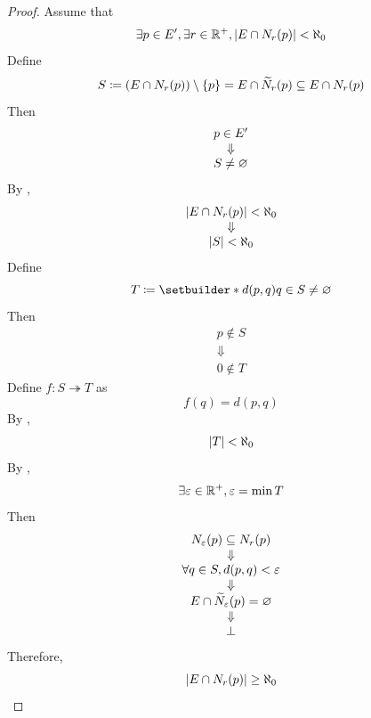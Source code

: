 \begin{proof}
    Assume that
    \[
    \exists p \in E', \exists r \in \R^{+}, \abs*{E \cap N_{r}(p)} < \aleph_{0}
    \]
    Define
    \[
    S \coloneqq (E \cap N_{r}(p)) \setminus \set*{p} = E \cap \widetilde{N}_{r}(p) \subseteq E \cap N_{r}(p)
    \]
    Then
    \[
    \begin{array}{c}
        p \in E' \\
        \Downarrow \\
        S \neq \vnot
    \end{array}
    \]
    By ,
    \[
    \begin{array}{c}
        \abs*{E \cap N_{r}(p)} < \aleph_{0} \\
        \Downarrow \\
        \abs*{S} < \aleph_{0}
    \end{array}
    \]
    Define
    \[
    T \coloneqq \setbuilder*{d(p, q)}{q \in S} \neq \vnot
    \]
    Then
    \[
    \begin{array}{c}
        p \notin S \\
        \Downarrow \\
        0 \notin T
    \end{array}
    \]
    Define $f: S \twoheadrightarrow T$ as
    \[
    f(q) = d(p, q)
    \]
    By ,
    \[
    \abs*{T} < \aleph_{0}
    \]
    By ,
    \[
    \exists \veps \in \R^{+}, \veps = \min T
    \]
    Then
    \[
    \begin{array}{c}
        N_{\veps}(p) \subseteq N_{r}(p) \\
        \Downarrow \\
        \forall q \in S, d(p, q) < \veps \\
        \Downarrow \\
        E \cap \widetilde{N}_{\veps}(p) = \vnot \\
        \Downarrow \\
        \bot
    \end{array}
    \]
    Therefore,
    \[
    \abs*{E \cap N_{r}(p)} \geq \aleph_{0}
    \]
\end{proof}
